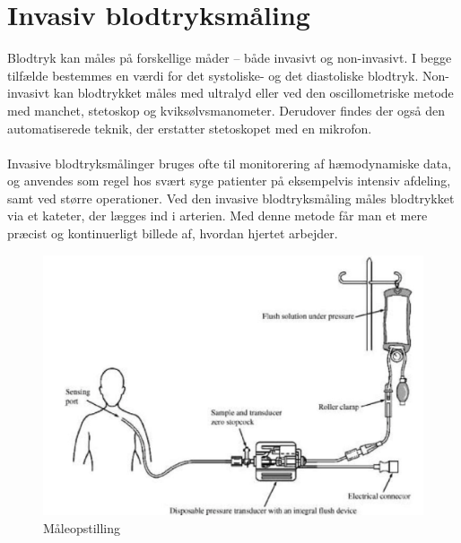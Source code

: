 \section{Invasiv blodtryksmåling}
Blodtryk kan måles på forskellige måder – både invasivt og non-invasivt. I begge tilfælde bestemmes en værdi for det systoliske- og det diastoliske blodtryk. Non-invasivt kan blodtrykket måles med ultralyd eller ved den oscillometriske metode med manchet, stetoskop og kviksølvsmanometer. Derudover findes der også den automatiserede teknik, der erstatter stetoskopet med en mikrofon. \\\\
Invasive blodtryksmålinger bruges ofte til monitorering af hæmodynamiske data, og anvendes som regel hos svært syge patienter på eksempelvis intensiv afdeling, samt ved større operationer. Ved den invasive blodtryksmåling måles blodtrykket via et kateter, der lægges ind i arterien. Med denne metode får man et mere præcist og kontinuerligt billede af, hvordan hjertet arbejder. 

\begin{figure}[H]
	\centering
	\includegraphics[width=1\textwidth]{Figurer/Snip20151207_50}
	\caption{Måleopstilling}
\end{figure}

